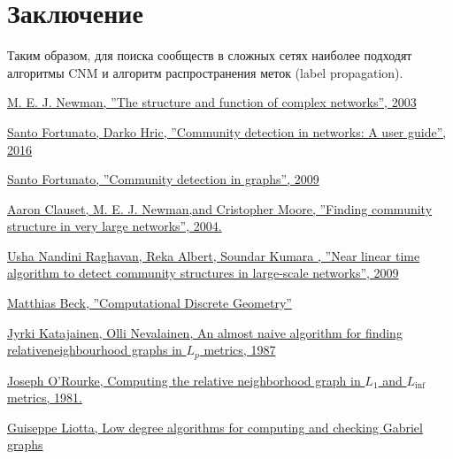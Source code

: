 \documentclass{article}
\begin{document}
\section*{Заключение}

Таким образом, для поиска сообществ в сложных сетях наиболее подходят алгоритмы CNM и алгоритм распространения меток (label propagation).

\begin{thebibliography}{9}

 \href{https://arxiv.org/pdf/cond-mat/0303516.pdf}{M. E. J. Newman, ''The structure and function of complex networks'', 2003}
 
 \href{https://arxiv.org/abs/1608.00163}{Santo Fortunato, Darko Hric, ''Community detection in networks:  A user guide'', 2016}

 \href{https://arxiv.org/abs/0906.0612}{Santo Fortunato, ''Community detection in graphs'', 2009}

 \href{https://arxiv.org/pdf/cond-mat/0408187.pdf}{Aaron Clauset, M. E. J. Newman,and Cristopher Moore, ''Finding community structure in very large networks'', 2004.}

 \href{https://arxiv.org/abs/0709.2938}{Usha Nandini Raghavan, Reka Albert, Soundar Kumara , ''Near linear time algorithm to detect community structures in large-scale networks'', 2009}

 \href{http://math.sfsu.edu/beck/teach/870/brendan.pdf}{Matthias Beck, ''Computational Discrete Geometry''}

 \href{http://www.numdam.org/article/ITA_1987__21_2_199_0.pdf}{Jyrki Katajainen, Olli Nevalainen, An almost naive algorithm for finding relativeneighbourhood graphs in $L_p$ metrics, 1987}

 \href{http://cs.smith.edu/~jorourke/Papers/RelativeNeighborhood.pdf}{Joseph O'Rourke, Computing the relative neighborhood graph in $L_1$ and $L_{\inf}$ metrics, 1981.}

 \href{ftp://ftp.cs.brown.edu/pub/techreports/96/cs96-28.pdf}{Guiseppe Liotta, Low degree algorithms for computing and checking Gabriel graphs}

\end{thebibliography} 
\end{document}

